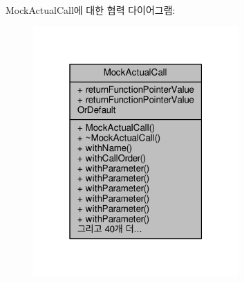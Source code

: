 Mock\+Actual\+Call에 대한 협력 다이어그램\+:
\nopagebreak
\begin{figure}[H]
\begin{center}
\leavevmode
\includegraphics[width=223pt]{class_mock_actual_call__coll__graph}
\end{center}
\end{figure}
